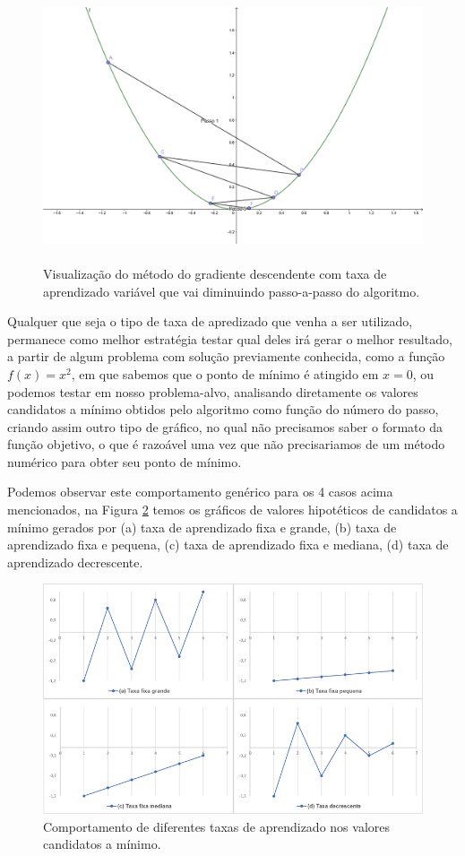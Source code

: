 \begin{figure}[htb]
\centering
\includegraphics[height=8cm]{figuras/grad_3}
\caption{Visualização do método do gradiente descendente com taxa de aprendizado variável que vai diminuindo passo-a-passo do algoritmo.}
\label{fig:grad_3}
\end{figure}

Qualquer que seja o tipo de taxa de apredizado que venha a ser utilizado, permanece como melhor estratégia testar qual deles irá gerar o melhor resultado, a partir de algum problema com solução previamente conhecida, como a função $f(x) = x^2$, em que sabemos que o ponto de mínimo é atingido em $x = 0$, ou podemos testar em nosso problema-alvo, analisando diretamente os valores candidatos a mínimo obtidos pelo algoritmo como função do número do passo, criando assim outro tipo de gráfico, no qual não precisamos saber o formato da função objetivo, o que é razoável uma vez que não precisariamos de um método numérico para obter seu ponto de mínimo.

Podemos observar este comportamento genérico para os 4 casos acima mencionados, na Figura \ref{fig:grad_4} temos os gráficos de valores hipotéticos de candidatos a mínimo gerados por (a) taxa de aprendizado fixa e grande, (b) taxa de aprendizado fixa e pequena, (c) taxa de aprendizado fixa e mediana, (d) taxa de aprendizado decrescente.

\begin{figure}[htb]
\centering
\includegraphics[width=14cm]{figuras/grad_4}
\caption{Comportamento de diferentes taxas de aprendizado nos valores candidatos a mínimo.}
\label{fig:grad_4}
\end{figure}

